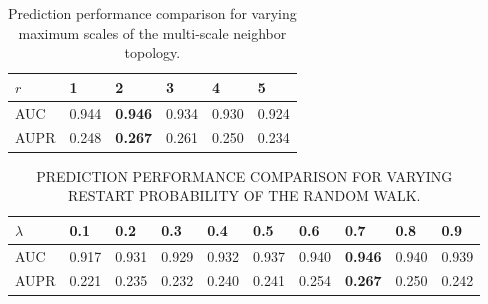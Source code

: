 \documentclass[journal,twoside,web]{ieeecolor}
\begin{document}
\begin{table}
	\centering
	\begin{threeparttable}[b]
		 \caption{Prediction performance comparison for varying maximum scales of the multi-scale neighbor topology.}\label{tab:tab_r}
    \label{tab:r}
        \begin{tabular}{p{1cm}<{\centering} p{1cm}<{\centering} p{1cm}<{\centering} p{1cm}<{\centering} p{1cm}<{\centering} p{1cm}<{\centering}}
            \hline
            \textbf{$r$} & \textbf{1} & \textbf{2} & \textbf{3} &  \textbf{4} & \textbf{5}\\
            \hline
            AUC & 0.944 & \textbf{0.946} & 0.934 &  0.930 & 0.924 \\
            AUPR & 0.248 & \textbf{0.267} & 0.261 &  0.250 & 0.234 \\
            \hline
        \end{tabular}
		\vspace{-0.4cm}
	\end{threeparttable}
\end{table}

\begin{table}
	\centering
	\begin{threeparttable}[b]
		 \caption{PREDICTION PERFORMANCE COMPARISON FOR VARYING RESTART PROBABILITY OF THE RANDOM WALK.}\label{tab:tab_lamda}
    \label{tab:lamda}
        \begin{tabular}{p{0.7cm}<{\centering} p{0.4cm}<{\centering} p{0.43cm}<{\centering} p{0.43cm}<{\centering} p{0.43cm}<{\centering} p{0.43cm}<{\centering} p{0.43cm}<{\centering} p{0.43cm}<{\centering} p{0.4cm}<{\centering} p{0.43cm}<{\centering}}
            \hline
            \textbf{$\lambda$} & \textbf{0.1} & \textbf{0.2} & \textbf{0.3} &  \textbf{0.4} & \textbf{0.5} & \textbf{0.6} & \textbf{0.7} & \textbf{0.8} &  \textbf{0.9}\\
            \hline
            AUC & 0.917 & 0.931 & 0.929 & 0.932 & 0.937 & 0.940 & \textbf{0.946} & 0.940 & 0.939 \\
            AUPR & 0.221 & 0.235 & 0.232 & 0.240 & 0.241 & 0.254 & \textbf{0.267} & 0.250 & 0.242\\
            \hline
        \end{tabular}
		\vspace{-0.4cm}
	\end{threeparttable}
\end{table}
\end{document}
